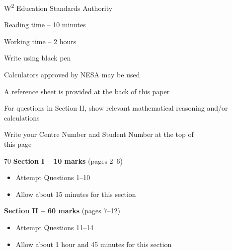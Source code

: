 \begin{coverpage}
	{\fontsize{13pt}{13pt}\selectfont W\textsuperscript{2} Education Standards Authority}
	\vspace{2.4cm}



	\vspace{1cm}

		\begin{generalinstructions}
			\item Reading time -- 10 minutes
			\item Working time -- 2 hours
			\item Write using black pen
			\item Calculators approved by NESA may be used
			\item A reference sheet is provided at the back of this paper
			\item For questions in Section II, show relevant mathematical reasoning and/or calculations
			\item Write your Centre Number and Student Number at the top of \\ this page
		\end{generalinstructions}

	\vspace{1cm}

	\begin{sectionlist}{70}
		\textbf{Section I -- 10 marks} (pages 2--6)
		\begin{itemize}
			\item Attempt Questions 1--10
			\item Allow about 15 minutes for this section
		\end{itemize}
		\textbf{Section II -- 60 marks} (pages 7--12)
		\begin{itemize}
			\item Attempt Questions 11--14
			\item Allow about 1 hour and 45 minutes for this section
		\end{itemize}
	\end{sectionlist}
\end{coverpage}
